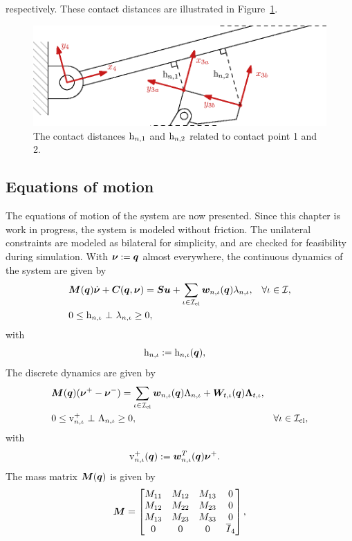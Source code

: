 \documentclass[../DC2019003Bouma.tex]{subfiles}
\begin{document}
respectively. These contact distances are illustrated in Figure~\ref{fig:5guards}.
\begin{figure}[bt!]
\centering
\includegraphics[width=.7\textwidth]{guards.eps}\caption{The contact distances $\mathrm{h}_{n,1}$ and $\mathrm{h}_{n,2}$ related to contact point 1 and 2.}\label{fig:5guards}
\end{figure}

\subsection{Equations of motion}
The equations of motion of the system are now presented. Since this chapter is work in progress, the system is modeled without friction. The unilateral constraints are modeled as bilateral for simplicity, and are checked for feasibility during simulation. With $\boldsymbol{\nu} := {\boldsymbol{q}}$ almost everywhere, the continuous dynamics of the system are given by
\begin{align}
&{\boldsymbol{M}}({\boldsymbol{q}})\dot{\boldsymbol{\nu}} + {\boldsymbol{C}}({\boldsymbol{q}},\boldsymbol{\nu}) = {\boldsymbol{S}}{\boldsymbol{u}} + \sum_{\iota\in\mathcal{I}_{\text{cl}}}{\boldsymbol{w}}_{n,\iota}({\boldsymbol{q}})\lambda_{n,\iota}, &\forall \iota\in\mathcal{I}, \label{eq:5ncpcontact1}\\
&0\leq \mathrm{h}_{n,\iota}\ \bot\ \lambda_{n,\iota} \geq 0,\label{eq:5ncpcontact2}
\end{align}
with 
\begin{align}
&\mathrm{h}_{n,\iota} := \mathrm{h}_{n,\iota}({\boldsymbol{q}}),\label{eq:5h}
\end{align}
The discrete dynamics are given by
\begin{align}
&{\boldsymbol{M}}({\boldsymbol{q}})(\boldsymbol{\nu}^+ - \boldsymbol{\nu}^-) = \sum_{\iota\in\mathcal{I}_{\text{cl}}} {\boldsymbol{w}}_{n,\iota}({\boldsymbol{q}})\Lambda_{n,\iota} + {\boldsymbol{W}}_{t,\iota}({\boldsymbol{q}})\boldsymbol{\Lambda}_{t,\iota}, \label{eq:5ncpimpact1}\\
&0\leq \mathrm{v}_{n,\iota}^+\ \bot\ \Lambda_{n,\iota} \geq 0, &\forall \iota\in\mathcal{I}_{\text{cl}},\label{eq:5ncpimpact2}
\end{align}
with 
\begin{align}
\mathrm{v}^+_{n,\iota}({\boldsymbol{q}}) &:= {\boldsymbol{w}}^T_{n,\iota}({\boldsymbol{q}}) \boldsymbol{\nu}^+.
\end{align}
The mass matrix ${\boldsymbol{M}}({\boldsymbol{q}})$ is given by
\begin{align}
{\boldsymbol{M}} = \begin{bmatrix}
M_{11} & M_{12} & M_{13} & 0\\
M_{12} & M_{22} & M_{23} & 0\\
M_{13} & M_{23} & M_{33} & 0\\
0 & 0 & 0 & \overline{I}_4
\end{bmatrix},
\end{align}
\end{document}
